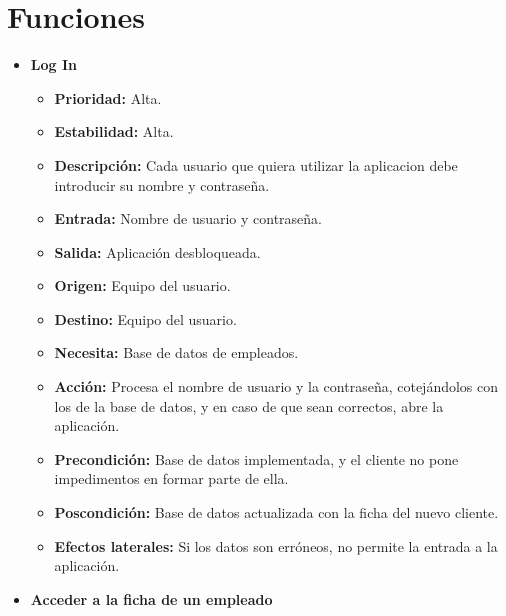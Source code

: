\documentclass[spanish,a4paper,11pt, twoside]{report}	%
\begin{document}

\section{Funciones}

	\begin{itemize}%



		\item \textbf{Log In}  %

		\begin{itemize}
			\item \textbf{Prioridad: }Alta.
			\item \textbf{Estabilidad: }Alta.
			\item \textbf{Descripción: }Cada usuario que quiera utilizar la aplicacion debe introducir su nombre y contraseña.
			\item \textbf{Entrada: } Nombre de usuario y contraseña.
			\item \textbf{Salida: }Aplicación desbloqueada.
			\item \textbf{Origen: }Equipo del usuario.
			\item \textbf{Destino: }Equipo del usuario.
			\item \textbf{Necesita: }Base de datos de empleados.
			\item \textbf{Acción: }Procesa el nombre de usuario y la contraseña, cotejándolos con los de la base de datos, y en caso de que sean correctos, abre la aplicación.
			\item \textbf{Precondición: }Base de datos implementada, y el cliente no pone impedimentos en formar parte de ella.
			\item \textbf{Poscondición: }Base de datos actualizada con la ficha del nuevo cliente. 
			\item \textbf{Efectos laterales: }Si los datos son erróneos, no permite la entrada a la aplicación.
		\end{itemize}%

		
		\item \textbf{Acceder a la ficha de un empleado}  %


\end{itemize}
\end{document}
